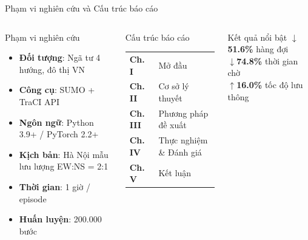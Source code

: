 \begin{frame}{Phạm vi nghiên cứu và Cấu trúc báo cáo}
  \begin{columns}[T]
    \begin{block}{Phạm vi nghiên cứu}
      \begin{itemize}
        \item \textbf{Đối tượng}: Ngã tư 4 hướng, đô thị VN
        \item \textbf{Công cụ}: SUMO + TraCI API
        \item \textbf{Ngôn ngữ}: Python 3.9+ / PyTorch 2.2+
        \item \textbf{Kịch bản}: Hà Nội mẫu\\
              lưu lượng EW:NS = 2:1
        \item \textbf{Thời gian}: 1 giờ / episode
        \item \textbf{Huấn luyện}: 200.000 bước
      \end{itemize}
    \end{block}

    \begin{block}{Cấu trúc báo cáo}
      \begin{tabular}{ll}
        \textbf{Ch. I}   & Mở đầu \\[2pt]
        \textbf{Ch. II}  & Cơ sở lý thuyết \\[2pt]
        \textbf{Ch. III} & Phương pháp đề xuất \\[2pt]
        \textbf{Ch. IV}  & Thực nghiệm \& Đánh giá \\[2pt]
        \textbf{Ch. V}   & Kết luận \\
      \end{tabular}
    \end{block}

    \vspace{8pt}
    \begin{exampleblock}{Kết quả nổi bật}
      \centering
      $\downarrow$\textbf{51.6\%} hàng đợi\\
      $\downarrow$\textbf{74.8\%} thời gian chờ\\
      $\uparrow$\textbf{16.0\%} tốc độ lưu thông
    \end{exampleblock}
  \end{columns}
\end{frame}

